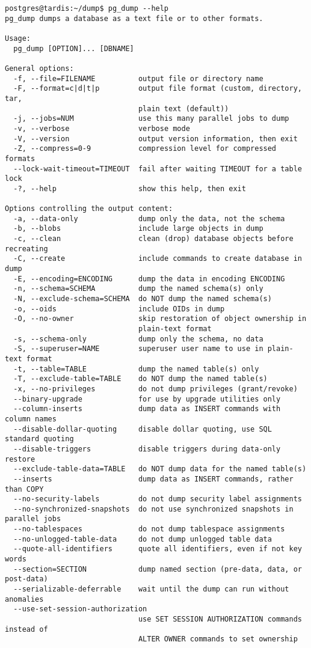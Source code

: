 \begin{verbatim}
postgres@tardis:~/dump$ pg_dump --help
pg_dump dumps a database as a text file or to other formats.

Usage:
  pg_dump [OPTION]... [DBNAME]

General options:
  -f, --file=FILENAME          output file or directory name
  -F, --format=c|d|t|p         output file format (custom, directory, tar,
                               plain text (default))
  -j, --jobs=NUM               use this many parallel jobs to dump
  -v, --verbose                verbose mode
  -V, --version                output version information, then exit
  -Z, --compress=0-9           compression level for compressed formats
  --lock-wait-timeout=TIMEOUT  fail after waiting TIMEOUT for a table lock
  -?, --help                   show this help, then exit

Options controlling the output content:
  -a, --data-only              dump only the data, not the schema
  -b, --blobs                  include large objects in dump
  -c, --clean                  clean (drop) database objects before recreating
  -C, --create                 include commands to create database in dump
  -E, --encoding=ENCODING      dump the data in encoding ENCODING
  -n, --schema=SCHEMA          dump the named schema(s) only
  -N, --exclude-schema=SCHEMA  do NOT dump the named schema(s)
  -o, --oids                   include OIDs in dump
  -O, --no-owner               skip restoration of object ownership in
                               plain-text format
  -s, --schema-only            dump only the schema, no data
  -S, --superuser=NAME         superuser user name to use in plain-text format
  -t, --table=TABLE            dump the named table(s) only
  -T, --exclude-table=TABLE    do NOT dump the named table(s)
  -x, --no-privileges          do not dump privileges (grant/revoke)
  --binary-upgrade             for use by upgrade utilities only
  --column-inserts             dump data as INSERT commands with column names
  --disable-dollar-quoting     disable dollar quoting, use SQL standard quoting
  --disable-triggers           disable triggers during data-only restore
  --exclude-table-data=TABLE   do NOT dump data for the named table(s)
  --inserts                    dump data as INSERT commands, rather than COPY
  --no-security-labels         do not dump security label assignments
  --no-synchronized-snapshots  do not use synchronized snapshots in parallel jobs
  --no-tablespaces             do not dump tablespace assignments
  --no-unlogged-table-data     do not dump unlogged table data
  --quote-all-identifiers      quote all identifiers, even if not key words
  --section=SECTION            dump named section (pre-data, data, or post-data)
  --serializable-deferrable    wait until the dump can run without anomalies
  --use-set-session-authorization
                               use SET SESSION AUTHORIZATION commands instead of
                               ALTER OWNER commands to set ownership


\end{verbatim}
